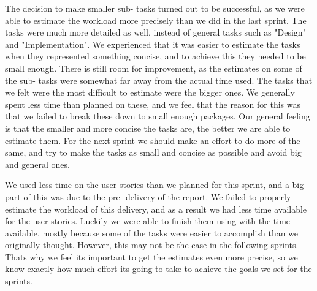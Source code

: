 The decision to make smaller sub- tasks turned out to be successful, as we were able to estimate the workload more precisely than we did in the last sprint. The tasks were much more detailed as well, instead of general tasks such as "Design" and "Implementation". We experienced that it was easier to estimate the tasks when they represented something concise, and to achieve this they needed to be small enough. There is still room for improvement, as the estimates on some of the sub- tasks were somewhat far away from the actual time used. The tasks that we felt were the most difficult to estimate were the bigger ones. We generally spent less time than planned on these, and we feel that the reason for this was that we failed to break these down to small enough packages. Our general feeling is that the smaller and more concise the tasks are, the better we are able to estimate them. For the next sprint we should make an effort to do more of the same, and try to make the tasks as small and concise as possible and avoid big and general ones.

We used less time on the user stories than we planned for this sprint, and a big part of this was due to the pre- delivery of the report. We failed to properly estimate the workload of this delivery, and as a result we had less time available for the user stories. Luckily we were able to finish them using with the time available, mostly because some of the tasks were easier to accomplish than we originally thought. However, this may not be the case in the following sprints. Thats why we feel its important to get the estimates even more precise, so we know exactly how much effort its going to take to achieve the goals we set for the sprints. 

